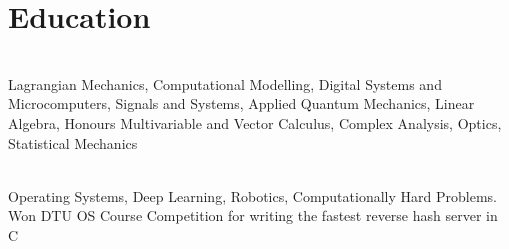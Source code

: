 \documentclass[]{deedy-resume-openfont}
\begin{document}
\section{Education}

\begin{adjustwidth}{0.55cm}{1.25cm}
	 \\
	 Lagrangian Mechanics, Computational Modelling, Digital Systems and Microcomputers, Signals and Systems, Applied Quantum Mechanics, Linear Algebra, Honours Multivariable and Vector Calculus, Complex Analysis, Optics, Statistical Mechanics
\end{adjustwidth}

\vspace{8pt}

\begin{adjustwidth}{0.55cm}{1.25cm}
	 \\
   Operating Systems, Deep Learning, Robotics, Computationally Hard Problems. \\
	Won DTU OS Course Competition for writing the fastest reverse hash server in C
\end{adjustwidth}

\vspace{10pt}
\end{document}
